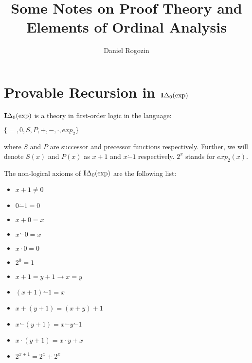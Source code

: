 \documentclass[8pt]{article}
\title{Some Notes on Proof Theory and Elements of Ordinal Analysis}
\author{Daniel Rogozin}
\date{ }
\theoremstyle{definition}
\theoremstyle{definition}
\theoremstyle{definition}
\theoremstyle{definition}
\theoremstyle{definition}
\theoremstyle{definition}
\theoremstyle{definition}
\theoremstyle{definition}
\theoremstyle{definition}
\theoremstyle{definition}
\theoremstyle{definition}
\theoremstyle{definition}
\theoremstyle{definition}
\theoremstyle{question}
\begin{document}
\maketitle

\tableofcontents

\newpage

\section{Provable Recursion in ${\bf I}\Delta_0(\operatorname{exp})$}

${\bf I}\Delta_0(\operatorname{exp})$ is a theory in first-order logic in the language:
\begin{center}
  $\{ =, 0, S, P, +, \dot{-}, \cdot, exp_2 \}$
\end{center}
where $S$ and $P$ are successor and precessor functions respectively.
Further, we will denote $S(x)$ and $P(x)$ as $x + 1$ and $x \dot{-} 1$ respectively.
$2^x$ stands for $exp_2(x)$.

The non-logical axioms of ${\bf I}\Delta_0(\operatorname{exp})$ are the following list:

\vspace{\baselineskip}

\begin{minipage}{0.45\textwidth}
  \begin{itemize}
    \item $x + 1 \neq 0$
    \item $0 \dot{-} 1 = 0$
    \item $x + 0 = x$
    \item $x \dot{-} 0 = x$
    \item $x \cdot 0 = 0$
    \item $2^0 = 1$
  \end{itemize}
\end{minipage}%
\hfill
\begin{minipage}{0.45\textwidth}
  \begin{itemize}
    \item $x + 1 = y + 1 \to x = y$
    \item $(x + 1) \dot{-} 1 = x$
    \item $x + (y + 1) = (x + y) + 1$
    \item $x \dot{-} (y + 1) = x \dot{-} y \dot{-} 1$
    \item $x \cdot (y + 1) = x \cdot y + x$
    \item $2^{x + 1} = 2^x + 2^x$
  \end{itemize}
\end{minipage}
\end{document}
